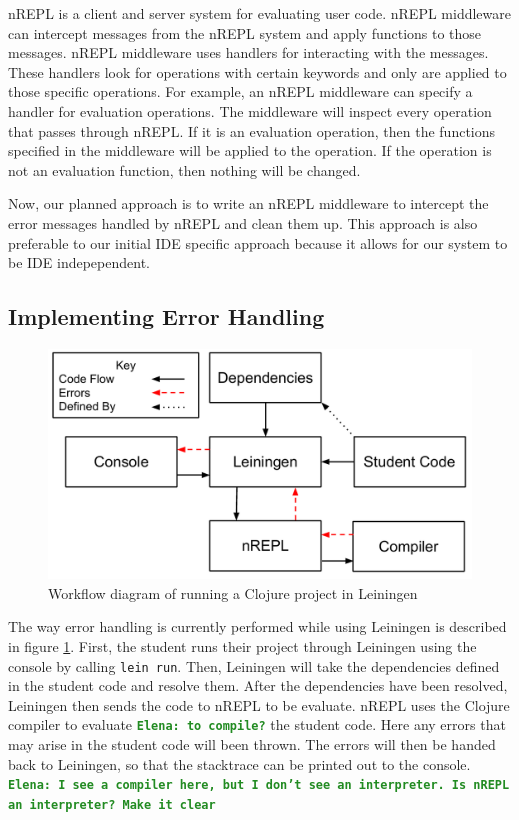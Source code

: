 \documentclass[12pt]{article}
\newcommand{\comment}[1]{{\bf \tt  {#1}}}
\newcommand{\emcomment}[1]{\textcolor{ForestGreen}{\comment{Elena: {#1}}}}
\begin{document}
nREPL is a client and server system for evaluating user code. nREPL middleware can intercept messages from the nREPL system and apply functions to those messages. nREPL middleware uses handlers for interacting with the messages. These handlers look for operations with certain keywords and only are applied to those specific operations. For example, an nREPL middleware can specify a handler for evaluation operations. The middleware will inspect every operation that passes through nREPL. If it is an evaluation operation, then the functions specified in the middleware will be applied to the operation. If the operation is not an evaluation function, then nothing will be changed.

Now, our planned approach is to write an nREPL middleware to intercept the error messages handled by nREPL and clean them up. This approach is also preferable to our initial IDE specific approach because it allows for our system to be IDE indepependent. 

\subsection{Implementing Error Handling}

\begin{figure}[h]
 \includegraphics[width=12cm]{CurrentErrorHandling.pdf}
 \centering
 \caption{Workflow diagram of running a Clojure project in Leiningen}
 \label{fig:CurrentError}
\end{figure}

The way error handling is currently performed while using Leiningen is described in figure \ref{fig:CurrentError}. First, the student runs their project through Leiningen using the console by calling \texttt{lein run}. Then, Leiningen will take the dependencies defined in the student code and resolve them. After the dependencies have been resolved, Leiningen then sends the code to nREPL to be evaluate. nREPL uses the Clojure compiler to evaluate \emcomment{to compile?} the student code. Here any errors that may arise in the student code will been thrown. The errors will then be handed back to Leiningen, so that the stacktrace can be printed out to the console.
\emcomment{I see a compiler here, but I don't see an interpreter. Is nREPL an interpreter? Make it clear}
\end{document}
